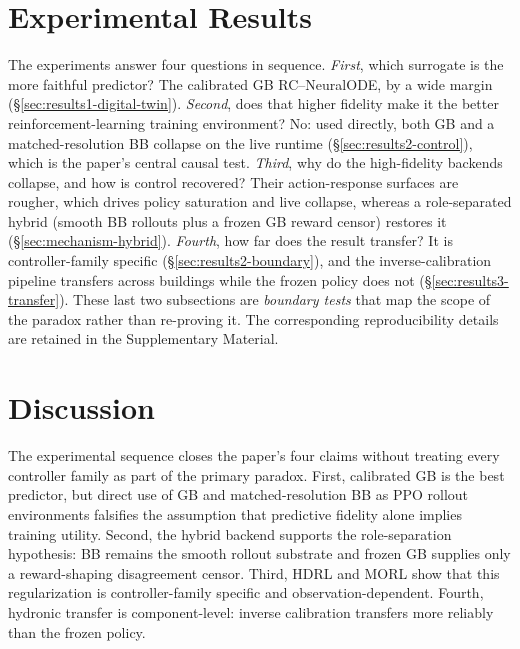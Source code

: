 \documentclass[a4paper,fleqn]{cas-sc}
\begin{document}
\section{Experimental Results}\label{sec:experimental}
The experiments answer four questions in sequence. \emph{First}, which surrogate is the more faithful predictor? The calibrated GB RC--NeuralODE, by a wide margin (\S\ref{sec:results1-digital-twin}). \emph{Second}, does that higher fidelity make it the better reinforcement-learning training environment? No: used directly, both GB and a matched-resolution BB collapse on the live runtime (\S\ref{sec:results2-control}), which is the paper's central causal test. \emph{Third}, why do the high-fidelity backends collapse, and how is control recovered? Their action-response surfaces are rougher, which drives policy saturation and live collapse, whereas a role-separated hybrid (smooth BB rollouts plus a frozen GB reward censor) restores it (\S\ref{sec:mechanism-hybrid}). \emph{Fourth}, how far does the result transfer? It is controller-family specific (\S\ref{sec:results2-boundary}), and the inverse-calibration pipeline transfers across buildings while the frozen policy does not (\S\ref{sec:results3-transfer}). These last two subsections are \emph{boundary tests} that map the scope of the paradox rather than re-proving it. The corresponding reproducibility details are retained in the Supplementary Material.





\section{Discussion}\label{sec:discussion}

The experimental sequence closes the paper's four claims without treating every controller family as part of the primary paradox. First, calibrated GB is the best predictor, but direct use of GB and matched-resolution BB as PPO rollout environments falsifies the assumption that predictive fidelity alone implies training utility. Second, the hybrid backend supports the role-separation hypothesis: BB remains the smooth rollout substrate and frozen GB supplies only a reward-shaping disagreement censor. Third, HDRL and MORL show that this regularization is controller-family specific and observation-dependent. Fourth, hydronic transfer is component-level: inverse calibration transfers more reliably than the frozen policy.
\end{document}
